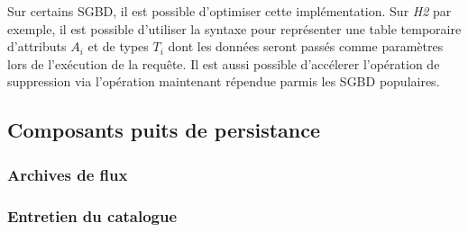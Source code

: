 Sur certains SGBD, il est possible d'optimiser cette implémentation. Sur \textit{H2} par exemple, il est possible d'utiliser la syntaxe  pour représenter une table temporaire d'attributs $A_i$ et de types $T_i$ dont les données seront passés comme paramètres lors de l'exécution de la requête. Il est aussi possible d'accélerer l'opération de suppression via l'opération  maintenant répendue parmis les SGBD populaires.

\subsection{Composants puits de persistance}
\subsubsection{Archives de flux}
\subsubsection{Entretien du catalogue}